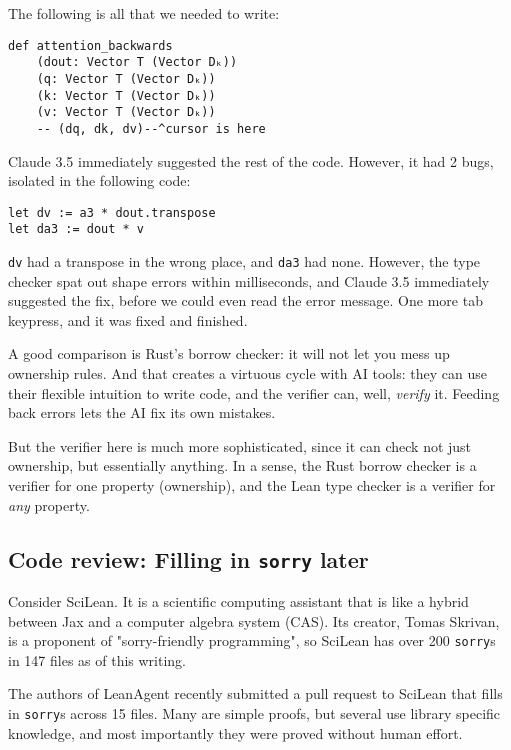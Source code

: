 \documentclass{article}
\begin{document}
The following is all that we needed to write:

\begin{verbatim}
def attention_backwards
    (dout: Vector T (Vector Dₖ))
    (q: Vector T (Vector Dₖ))
    (k: Vector T (Vector Dₖ))
    (v: Vector T (Vector Dₖ))
    -- (dq, dk, dv)--^cursor is here
\end{verbatim}

Claude 3.5 immediately suggested the rest of the code. However, it had 2 bugs, isolated in the following code:

\begin{verbatim}
let dv := a3 * dout.transpose
let da3 := dout * v
\end{verbatim}

\texttt{dv} had a transpose in the wrong place, and \texttt{da3} had none. However, the type checker spat out shape errors within milliseconds, and Claude 3.5 immediately suggested the fix, before we could even read the error message. One more tab keypress, and it was fixed and finished.

A good comparison is Rust's borrow checker: it will not let you mess up ownership rules. And that creates a virtuous cycle with AI tools: they can use their flexible intuition to write code, and the verifier can, well, \textit{verify} it. Feeding back errors lets the AI fix its own mistakes.

But the verifier here is much more sophisticated, since it can check not just ownership, but essentially anything. In a sense, the Rust borrow checker is a verifier for one property (ownership), and the Lean type checker is a verifier for \textit{any} property.

\subsection{Code review: Filling in \texttt{sorry} later}

Consider SciLean. It is a scientific computing assistant that is like a hybrid between Jax and a computer algebra system (CAS). Its creator, Tomas Skrivan, is a proponent of "sorry-friendly programming", so SciLean has over 200 \texttt{sorry}s in 147 files as of this writing.

The authors of LeanAgent recently submitted a pull request to SciLean that fills in \texttt{sorry}s across 15 files. Many are simple proofs, but several use library specific knowledge, and most importantly they were proved without human effort.
\end{document}
